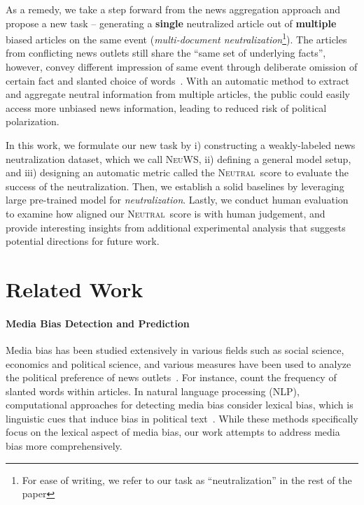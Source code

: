 \documentclass[11pt,a4paper]{article}
\newcommand{\ourdata}{{\scshape NeuWS}}
\newcommand{\neutral}{\textsc{Neutral}}
\begin{document}
As a remedy, we take a step forward from the news aggregation approach and propose a new task -- generating a \textbf{single} neutralized article out of \textbf{multiple} biased articles on the same event (\textit{multi-document neutralization}\footnote{For ease of writing, we refer to our task as ``neutralization'' in the rest of the paper}). 
The articles from conflicting news outlets still share the ``same set of underlying facts'', however, convey different impression of same event through deliberate omission of certain fact and slanted choice of words~\cite{gentzkow2006media}. 
With an automatic method to extract and aggregate neutral information from multiple articles, the public could easily access more unbiased news information, leading to reduced risk of political polarization. 

In this work, we formulate our new task by i) constructing a weakly-labeled news neutralization dataset, which we call \ourdata, ii) defining a general model setup, and iii) designing an automatic metric called the \neutral~score to evaluate the success of the neutralization. Then, we establish a solid baselines by leveraging large pre-trained model for \textit{neutralization}. Lastly, we conduct human evaluation to examine how aligned our \neutral~score is with human judgement, and provide interesting insights from additional experimental analysis that suggests potential directions for future work.

\section{Related Work}
\paragraph{Media Bias Detection and Prediction} 
Media bias has been studied extensively in various fields such as social science, economics and political science, and various measures have been used to analyze the political preference of news outlets~\cite{groseclose2005measure,miller2001spiral, park2011contrasting,gentzkow2010drives,haselmayer2017sentiment}. 
For instance, \citeauthor{gentzkow2010drives} count the frequency of slanted words within articles. 
In natural language processing (NLP), computational approaches for detecting media bias consider lexical bias, which is linguistic cues that induce bias in political text~\cite{recasens2013linguistic,yano2010shedding,lee2019team, hamborg2019illegal}. 
While these methods specifically focus on the lexical aspect of media bias, our work attempts to address media bias more comprehensively.
\end{document}
